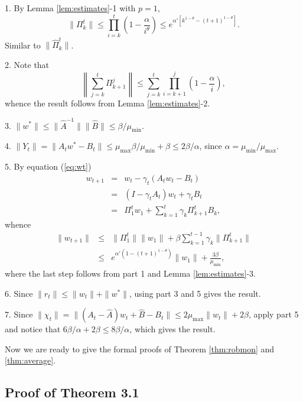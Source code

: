 \documentclass[twoside,twocolumn,journal]{IEEEtran}
\newenvironment{pf}[1][Proof]{\medskip\noindent\hspace{1em}{\itshape #1: }}{\hspace*{\fill}~\QED\par\endtrivlist\medskip}
\def\amax{{\mu_{\max}}}
\def\amin{{\mu_{\min}} }
\begin{document}
\begin{pf} 1. By Lemma \ref{lem:estimates}-1 with $p=1$,
\[ \|\Pi^t_k \|\leq \prod_{i=k}^t \left( 1 - \frac{\alpha}{i^\theta} \right) \leq e^{\alpha'[k^{1-\theta} - (t+1)^{1-\theta}]}. \]
Similar to $\|\hat{\Pi}_k^t\|$.

2. Note that
\[ \left\|\sum_{j=k}^t \Pi_{k+1}^j \right\| \leq \sum_{j=k}^t \prod_{i=k+1}^j \left( 1- \frac{\alpha}{i} \right), \]
whence the result follows from Lemma \ref{lem:estimates}-2.

3. $\|w^\ast\|\leq \|\hat{A}^{-1}\|\|\hat{B}\|\leq \beta/\amin$.

4. $\|Y_t\| = \| A_t w^\ast - B_t \| \leq \amax \beta /\amin + \beta \leq 2 \beta/\alpha$, since $\alpha=\amin/\amax$.

5. By equation (\ref{eq:wt})
\begin{eqnarray*}
w_{t+1} & = & w_t - \gamma_t (A_t w_t - B_t) \\
& = & (I - \gamma_t A_t) w_t + \gamma_t B_t \\
& = & \Pi_1^t w_1 + \sum_{k=1}^t \gamma_k \Pi_{k+1}^t B_k,
\end{eqnarray*}
whence
\begin{eqnarray*}
\|w_{t+1}\| & \leq & \|\Pi_1^t\| \|w_1\| + \beta \sum_{k=1}^{t-1} \gamma_k \|\Pi_{k+1}^t\| \\
& \leq & e^{\alpha'(1-(t+1)^{1-\theta})} \|w_1\|+ \frac{3\beta}{\amin},
\end{eqnarray*}
where the last step follows from part 1 and Lemma \ref{lem:estimates}-3.

6. Since $\| r_t \| \leq \|w_t \| + \|w^\ast\|$, using part 3 and 5 gives the result.

7. Since $\|\chi_t\|=\|(A_t - \hat{A})w_t + \hat{B}-B_t \| \leq 2 \amax\|w_t\| + 2\beta$, apply part 5 and notice that $6\beta/\alpha+2\beta\leq 8\beta/\alpha$,
which gives the result.
\end{pf}

Now we are ready to give the formal proofs of Theorem \ref{thm:robmon} and \ref{thm:average}.


\subsection{Proof of Theorem 3.1}

\end{document}
